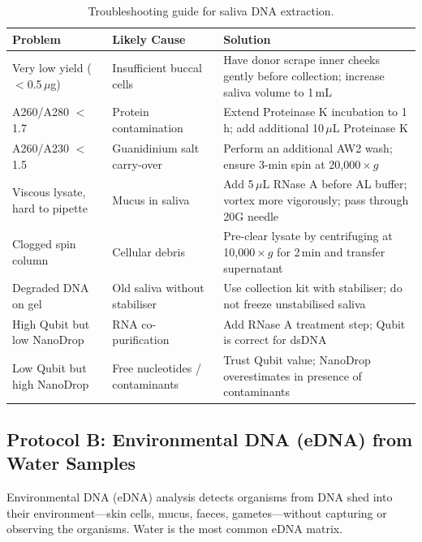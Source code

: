 \begin{table}[htbp]
\centering
\caption{Troubleshooting guide for saliva DNA extraction.}
\label{tab:protocols:saliva_troubleshooting}
\small
\renewcommand{\arraystretch}{1.3}
\begin{tabularx}{\textwidth}{@{}l l X@{}}
\toprule
\textbf{Problem} & \textbf{Likely Cause} & \textbf{Solution} \\
\midrule
Very low yield ($<$0.5\,$\mu$g) & Insufficient buccal cells & Have donor scrape inner cheeks gently before collection; increase saliva volume to 1\,mL \\
\addlinespace
A260/A280 $<$ 1.7 & Protein contamination & Extend Proteinase K incubation to 1\,h; add additional 10\,$\mu$L Proteinase K \\
\addlinespace
A260/A230 $<$ 1.5 & Guanidinium salt carry-over & Perform an additional AW2 wash; ensure 3-min spin at 20,000\,$\times$\,$g$ \\
\addlinespace
Viscous lysate, hard to pipette & Mucus in saliva & Add 5\,$\mu$L RNase A before AL buffer; vortex more vigorously; pass through 20G needle \\
\addlinespace
Clogged spin column & Cellular debris & Pre-clear lysate by centrifuging at 10,000\,$\times$\,$g$ for 2\,min and transfer supernatant \\
\addlinespace
Degraded DNA on gel & Old saliva without stabiliser & Use collection kit with stabiliser; do not freeze unstabilised saliva \\
\addlinespace
High Qubit but low NanoDrop & RNA co-purification & Add RNase A treatment step; Qubit is correct for dsDNA \\
\addlinespace
Low Qubit but high NanoDrop & Free nucleotides / contaminants & Trust Qubit value; NanoDrop overestimates in presence of contaminants \\
\bottomrule
\end{tabularx}
\end{table}

\subsection{Protocol B: Environmental DNA (eDNA) from Water Samples}
\label{subsec:protocols:edna}

Environmental DNA (eDNA) analysis detects organisms from DNA shed into their environment---skin cells, mucus, faeces, gametes---without capturing or observing the organisms. Water is the most common eDNA matrix.

